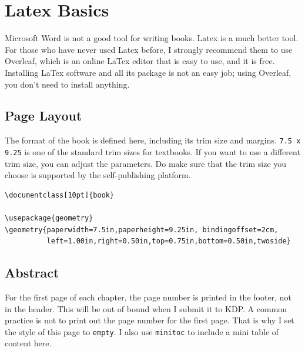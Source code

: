 

\chapter{Latex Basics}
\label{chapter:basics}

\thispagestyle{empty}


Microsoft Word is not a good tool for writing books. Latex is a much
better tool. 
For those who have never used Latex before, I strongly recommend 
them to use Overleaf, which is an online LaTex editor that is easy to use,
and it is free. Installing LaTex software and all its package is not 
an easy job; using Overleaf, you don't need to install anything. 


\minitoc
\newpage



\section{Page Layout} 

The format of the book is defined here, including its trim size and 
margins. \texttt{7.5 x 9.25} is one of the standard trim sizes for 
textbooks. 
If you want to use a different trim size, you can adjust the
parameters. Do make sure that the trim size you choose is supported by the
self-publishing platform.  


\begin{lstlisting}
\documentclass[10pt]{book}

\usepackage{geometry}
\geometry{paperwidth=7.5in,paperheight=9.25in, bindingoffset=2cm,
          left=1.00in,right=0.50in,top=0.75in,bottom=0.50in,twoside}
\end{lstlisting}
 


\section{Abstract}
\label{basics:abstract}

For the first page of each chapter, the page number is printed in the footer, not
in the header. This will be out of bound when I submit it to KDP. 
A common practice is not to print out the page number for the first page.
That is why I set the style of this page to \texttt{empty}. 
I also use \texttt{minitoc} to include a mini table of content 
here. 


